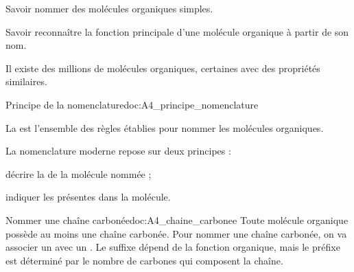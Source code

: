 \tetePremStssOrga
{}

\begin{objectifs}
  \item Savoir nommer des molécules organiques simples.
  \item Savoir reconnaître la fonction principale d'une molécule organique à partir de son nom.
\end{objectifs}

\begin{contexte}
  Il existe des millions de molécules organiques, certaines avec des propriétés similaires.

\end{contexte}


\begin{doc}{Principe de la nomenclature}{doc:A4_principe_nomenclature}
  \begin{importants}  
    La  est l'ensemble des règles établies pour nommer les molécules organiques.
  \end{importants}
   
  La nomenclature moderne repose sur deux principes :
  \begin{listePoints}
    \item décrire la  de la molécule nommée ;
    \item indiquer les  présentes dans la molécule.
  \end{listePoints}
\end{doc}

\begin{doc}{Nommer une chaîne carbonée}{doc:A4_chaine_carbonee}
  Toute molécule organique possède au moins une chaîne carbonée.
  Pour nommer une chaîne carbonée, on va associer un  avec un .
  Le suffixe dépend de la fonction organique, mais le préfixe est déterminé par le nombre de carbones qui composent la chaîne.
  
\end{doc}


